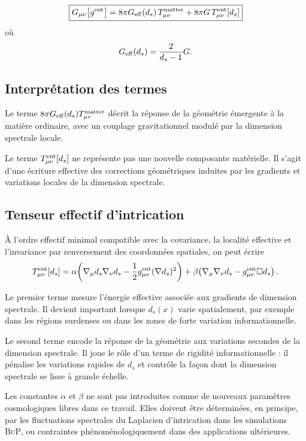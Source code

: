\documentclass[11pt]{article}
\newcommand{\Geff}{G_{\rm eff}}
\newcommand{\BuP}{\textsc{BuP}}
\newcommand{\ent}{\rm ent}
\begin{document}
\[
\boxed{
G_{\mu\nu}\!\left[g^{\rm ent}\right]
=
8\pi\Geff(d_s)\,
T_{\mu\nu}^{\rm matter}
+
8\pi G\,
T_{\mu\nu}^{\ent}[d_s]
}
\]
o\`u
\[
\Geff(d_s)
=
\frac{2}{d_s-1}G.
\]

\subsection{Interpr\'etation des termes}

Le terme $8\pi\Geff(d_s)T_{\mu\nu}^{\rm matter}$ d\'ecrit la r\'eponse de la
g\'eom\'etrie \'emergente \`a la mati\`ere ordinaire, avec un couplage gravitationnel
modul\'e par la dimension spectrale locale.

Le terme $T_{\mu\nu}^{\ent}[d_s]$ ne repr\'esente pas une nouvelle composante
mat\'erielle. Il s'agit d'une \'ecriture effective des corrections g\'eom\'etriques
induites par les gradients et variations locales de la dimension spectrale.

\subsection{Tenseur effectif d'intrication}

\`A l'ordre effectif minimal compatible avec la covariance, la localit\'e effective et
l'invariance par renversement des coordonn\'ees spatiales, on peut \'ecrire
\[
T_{\mu\nu}^{\ent}[d_s]
=
\alpha
\!\left(
\nabla_\mu d_s\nabla_\nu d_s
-
\frac12 g_{\mu\nu}^{\rm ent}(\nabla d_s)^2
\right)
+
\beta
\!\left(
\nabla_\mu\nabla_\nu d_s
-
g_{\mu\nu}^{\rm ent}\Box d_s
\right).
\]

Le premier terme mesure l'\'energie effective associ\'ee aux gradients de dimension
spectrale. Il devient important lorsque $d_s(x)$ varie spatialement, par exemple dans
les r\'egions surdenses ou dans les zones de forte variation informationnelle.

Le second terme encode la r\'eponse de la g\'eom\'etrie aux variations secondes de
la dimension spectrale. Il joue le r\^ole d'un terme de rigidit\'e informationnelle :
il p\'enalise les variations rapides de $d_s$ et contr\^ole la fa\c{c}on dont la dimension
spectrale se lisse \`a grande \'echelle.

Les constantes $\alpha$ et $\beta$ ne sont pas introduites comme de nouveaux
param\`etres cosmologiques libres dans ce travail. Elles doivent \^etre d\'etermin\'ees,
en principe, par les fluctuations spectrales du Laplacien d'intrication dans les
simulations \BuP, ou contraintes ph\'enom\'enologiquement dans des applications
ult\'erieures.
\end{document}
